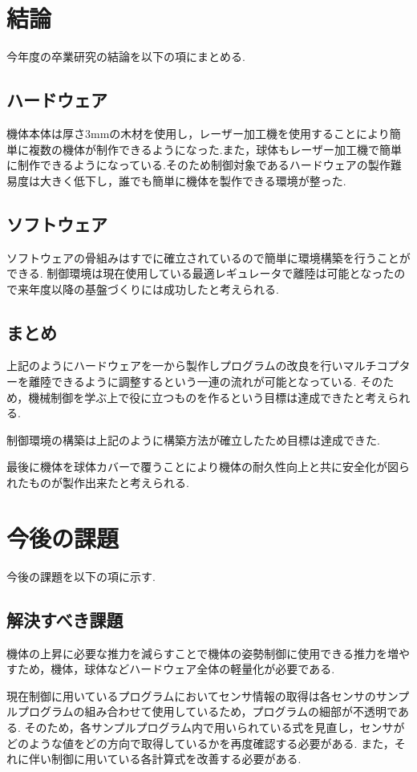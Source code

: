 \documentclass[12pt,oneside]{sotsuken_paper}
\begin{document}
\section{結論}
今年度の卒業研究の結論を以下の項にまとめる.

\subsection{ハードウェア}
機体本体は厚さ3mmの木材を使用し，レーザー加工機を使用することにより簡単に複数の機体が制作できるようになった.また，球体もレーザー加工機で簡単に制作できるようになっている.そのため制御対象であるハードウェアの製作難易度は大きく低下し，誰でも簡単に機体を製作できる環境が整った.

\subsection{ソフトウェア}
ソフトウェアの骨組みはすでに確立されているので簡単に環境構築を行うことができる.
制御環境は現在使用している最適レギュレータで離陸は可能となったので来年度以降の基盤づくりには成功したと考えられる.

\subsection{まとめ}
上記のようにハードウェアを一から製作しプログラムの改良を行いマルチコプターを離陸できるように調整するという一連の流れが可能となっている.
そのため，機械制御を学ぶ上で役に立つものを作るという目標は達成できたと考えられる.


制御環境の構築は上記のように構築方法が確立したため目標は達成できた.


最後に機体を球体カバーで覆うことにより機体の耐久性向上と共に安全化が図られたものが製作出来たと考えられる.

\section{今後の課題}
今後の課題を以下の項に示す.

\subsection{解決すべき課題}
機体の上昇に必要な推力を減らすことで機体の姿勢制御に使用できる推力を増やすため，機体，球体などハードウェア全体の軽量化が必要である.


現在制御に用いているプログラムにおいてセンサ情報の取得は各センサのサンプルプログラムの組み合わせて使用しているため，プログラムの細部が不透明である.
そのため，各サンプルプログラム内で用いられている式を見直し，センサがどのような値をどの方向で取得しているかを再度確認する必要がある.
また，それに伴い制御に用いている各計算式を改善する必要がある.
\end{document}
